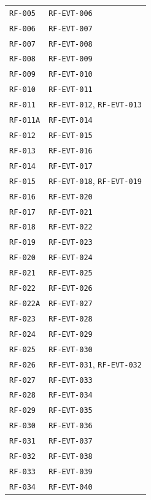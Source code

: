 \documentclass[10pt,letterpaper]{article}
\begin{document}
\begin{longtable}{P{3.0cm}P{10.6cm}}
\texttt{RF-005} & \texttt{RF-EVT-006}\\
\texttt{RF-006} & \texttt{RF-EVT-007}\\
\texttt{RF-007} & \texttt{RF-EVT-008}\\
\texttt{RF-008} & \texttt{RF-EVT-009}\\
\texttt{RF-009} & \texttt{RF-EVT-010}\\
\texttt{RF-010} & \texttt{RF-EVT-011}\\
\texttt{RF-011} & \texttt{RF-EVT-012}, \texttt{RF-EVT-013}\\
\texttt{RF-011A} & \texttt{RF-EVT-014}\\
\texttt{RF-012} & \texttt{RF-EVT-015}\\
\texttt{RF-013} & \texttt{RF-EVT-016}\\
\texttt{RF-014} & \texttt{RF-EVT-017}\\
\texttt{RF-015} & \texttt{RF-EVT-018}, \texttt{RF-EVT-019}\\
\texttt{RF-016} & \texttt{RF-EVT-020}\\
\texttt{RF-017} & \texttt{RF-EVT-021}\\
\texttt{RF-018} & \texttt{RF-EVT-022}\\
\texttt{RF-019} & \texttt{RF-EVT-023}\\
\texttt{RF-020} & \texttt{RF-EVT-024}\\
\texttt{RF-021} & \texttt{RF-EVT-025}\\
\texttt{RF-022} & \texttt{RF-EVT-026}\\
\texttt{RF-022A} & \texttt{RF-EVT-027}\\
\texttt{RF-023} & \texttt{RF-EVT-028}\\
\texttt{RF-024} & \texttt{RF-EVT-029}\\
\texttt{RF-025} & \texttt{RF-EVT-030}\\
\texttt{RF-026} & \texttt{RF-EVT-031}, \texttt{RF-EVT-032}\\
\texttt{RF-027} & \texttt{RF-EVT-033}\\
\texttt{RF-028} & \texttt{RF-EVT-034}\\
\texttt{RF-029} & \texttt{RF-EVT-035}\\
\texttt{RF-030} & \texttt{RF-EVT-036}\\
\texttt{RF-031} & \texttt{RF-EVT-037}\\
\texttt{RF-032} & \texttt{RF-EVT-038}\\
\texttt{RF-033} & \texttt{RF-EVT-039}\\
\texttt{RF-034} & \texttt{RF-EVT-040}\\

\end{longtable}
\end{document}
